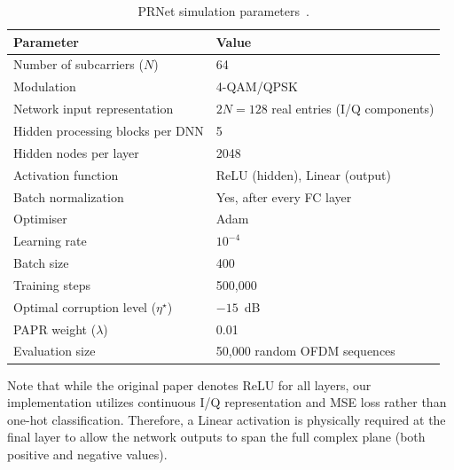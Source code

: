 \begin{table}[H]
    \centering
    \caption{PRNet simulation parameters~\cite{kim2017novel}.}
    \label{tab:prnet_params}
    \begin{tabular}{@{} l l @{}}
        \toprule
        \textbf{Parameter}                      & \textbf{Value}                         \\
        \midrule
        Number of subcarriers ($N$)             & 64                                     \\
        Modulation                              & 4-QAM/QPSK                             \\
        Network input representation            & $2N=128$ real entries (I/Q components) \\
        Hidden processing blocks per DNN        & 5                                      \\
        Hidden nodes per layer                  & 2048                                   \\
        Activation function                     & ReLU (hidden), Linear (output)         \\
        Batch normalization                     & Yes, after every FC layer              \\
        Optimiser                               & Adam                                   \\
        Learning rate                           & $10^{-4}$                              \\
        Batch size                              & 400                                    \\
        Training steps                          & 500{,}000                              \\
        Optimal corruption level ($\eta^\star$) & $-15$~dB                               \\
        PAPR weight ($\lambda$)                 & 0.01                                   \\
        Evaluation size                         & 50{,}000 random OFDM sequences         \\
        \bottomrule
    \end{tabular}
\end{table}

Note that while the original paper denotes ReLU for all layers, our implementation utilizes continuous I/Q representation and MSE loss rather than one-hot classification. Therefore, a Linear activation is physically required at the final layer to allow the network outputs to span the full complex plane (both positive and negative values).

